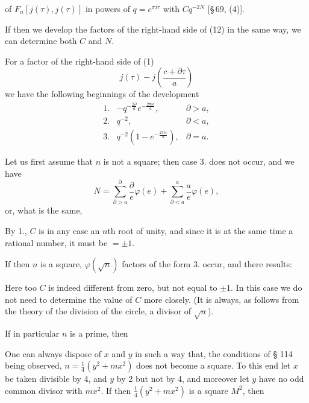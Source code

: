 of $F_n[j(\tau), j(\tau)]$ in powers of $q=e^{\pi i \tau}$ with $Cq^{-2N}$
[§\,69, (4)].

If then we develop the factors of the right-hand side of (12) in the same
way, we can determine both $C$ and $N$.

For a factor of the right-hand side of (1) %
\[
j(\tau) - j\left(\frac{c+\partial\tau}{a}\right)
\]
we have the following beginnings of the development
\[
\begin{array}{lll}
1. & -q^{-\frac{2\partial}{a}} e^{-\frac{2\pi i c}{a}}, & \partial > a,\\
2. & q^{-2}, & \partial < a,\\
3. & q^{-2}\left(1-e^{-\frac{2\pi i c}{a}}\right), & \partial = a.
\end{array}
\]

Let us first assume that $n$ is not a square; then case 3. does not occur,
and we have
\[
N = \sum_{\partial > a}^{\partial} \frac{\partial}{e}\varphi(e) + \sum_{\partial < a}^{a} \frac{a}{e}\varphi(e),
\]
or, what is the same,

By 1., $C$ is in any case an $n$th root of unity, and since it is at the same
time a rational number, it must be $=\pm 1$.

If then $n$ is a square, $\varphi(\sqrt{n})$ factors of the form 3. occur, and
there results:

Here too $C$ is indeed different from zero, but not equal to $\pm 1$.
In this case we do not need to determine the value of $C$ more closely.
(It is always, as follows from the theory of the division of the circle, a
divisor of $\sqrt{n}$).

If in particular $n$ is a prime, then

One can always dispose of $x$ and $y$ in such a way that, the conditions of
§ 114 being observed, $n = \frac{1}{4}(y^2+mx^2)$ does not become a square.
To this end let $x$ be taken divisible by 4, and $y$ by 2 but not by 4, and
moreover let $y$ have no odd common divisor with $mx^2$. If then
$\frac{1}{4}(y^2+mx^2)$ is a square $M^2$, then

